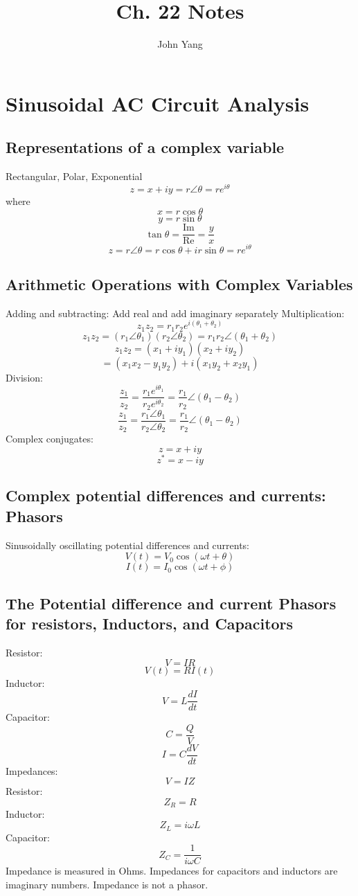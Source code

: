 \documentclass[twocolumn]{article}
\title{Ch. 22 Notes}
\author{John Yang}
\begin{document}
\maketitle
\section{Sinusoidal AC Circuit Analysis}
\subsection{Representations of a complex variable}
\begin{outline}
\1 Rectangular, Polar, Exponential \[z=x+iy=r\angle\theta=re^{i\theta}\] where \[x=r\cos\theta\]\[y=r\sin\theta\]\[\tan\theta=\dfrac{\text{Im}}{\text{Re}}=\dfrac{y}{x}\]\[z=r\angle\theta=r\cos\theta+ir\sin\theta=re^{i\theta}\]

\end{outline}
\subsection{Arithmetic Operations with Complex Variables}
\begin{outline}
\1 Adding and subtracting: Add real and add imaginary separately
\1 Multiplication: \[z_1z_2=r_1r_2e^{i(\theta_1+\theta_2)}\]\[z_1z_2=(r_1\angle\theta_1)(r_2\angle\theta_2)=r_1r_2\angle(\theta_1+\theta_2)\]\[z_1z_2=(x_1+iy_1)(x_2+iy_2)\]\[=(x_1x_2-y_1y_2)+i(x_1y_2+x_2y_1)\]
\1 Division: \[\dfrac{z_1}{z_2}=\dfrac{r_1e^{i\theta_1}}{r_2e^{i\theta_2}}=\dfrac{r_1}{r_2}\angle(\theta_1-\theta_2)\]\[\dfrac{z_1}{z_2}=\dfrac{r_1\angle\theta_1}{r_2\angle\theta_2}=\dfrac{r_1}{r_2}\angle(\theta_1-\theta_2)\]
\1 Complex conjugates: \[z=x+iy\]\[z^*=x-iy\]
\end{outline}
\subsection{Complex potential differences and currents: Phasors} 
\begin{outline}
\1 Sinusoidally oscillating potential differences and currents: \[V(t)=V_0\cos(\omega t+\theta)\]\[I(t)=I_0\cos(\omega t+\phi)\]
\end{outline}
\subsection{The Potential difference and current Phasors for resistors, Inductors, and Capacitors}
\begin{outline}
\1 Resistor: \[V=IR\]\[V(t)=RI(t)\]
\1 Inductor: \[V=L\dfrac{dI}{dt}\]
\1 Capacitor: \[C=\dfrac{Q}{V}\]\[I=C\dfrac{dV}{dt}\]
\1 Impedances: \[V=IZ\]
    \2 Resistor: \[Z_R=R\]
    \2 Inductor: \[Z_L=i\omega L\]
    \2 Capacitor: \[Z_C=\dfrac{1}{i\omega C}\]
\1 Impedance is measured in Ohms. Impedances for capacitors and inductors are imaginary numbers. Impedance is not a phasor. 
\end{outline}
\end{document}
